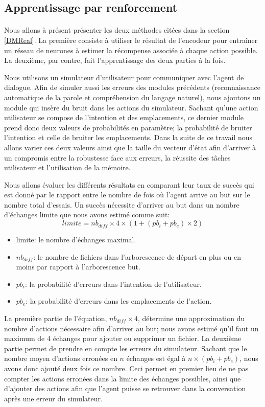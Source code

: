 \subsection{Apprentissage par renforcement}
\paragraph{}Nous allons à présent présenter les deux méthodes citées dans la section \ref{DMReal}. La première consiste à utiliser le résultat de l'encodeur pour entraîner un réseau de neurones à estimer la récompense associée à chaque action possible. La deuxième, par contre, fait l'apprentissage des deux parties à la fois.
\par Nous utilisons un simulateur d'utilisateur pour communiquer avec l'agent de dialogue. Afin de simuler aussi les erreurs des modules précédents (reconnaissance automatique de la parole et compréhension du langage naturel), nous ajoutons un module qui insère du bruit dans les actions du simulateur. Sachant qu'une action utilisateur se compose de l'intention et des emplacements, ce dernier module prend donc deux valeurs de probabilités en paramètre; la probabilité de bruiter l'intention et celle de bruiter les emplacements. Dans la suite de ce travail nous allons varier ces deux valeurs ainsi que la taille du vecteur d'état afin d'arriver à un compromis entre la robustesse face aux erreurs, la réussite des tâches utilisateur et l'utilisation de la mémoire.
\par Nous allons évaluer les différents résultats en comparant leur taux de succès qui est donné par le rapport entre le nombre de fois où l'agent arrive au but sur le nombre total d'essais. Un succès nécessite d'arriver au but dans un nombre d'échanges limite que nous avons estimé comme suit: 
\[limite = nb_{diff} \times 4 \times (1 + (pb_i + pb_e) \times 2) \]
\begin{itemize}
	\item limite: le nombre d'échanges maximal.
	\item $nb_{diff}$: le nombre de fichiers dans l'arborescence de départ en plus ou en moins par rapport à l'arborescence but.
	\item $pb_i$: la probabilité d'erreurs dans l'intention de l'utilisateur.
	\item $pb_e$: la probabilité d'erreurs dans les emplacements de l'action.
\end{itemize}
\par La première partie de l'équation, $nb_{diff} \times 4$, détermine une approximation du nombre d'actions nécessaire afin d'arriver au but; nous avons estimé qu'il faut un maximum de 4 échanges pour ajouter ou supprimer un fichier. La deuxième partie permet de prendre en compte les erreurs du simulateur. Sachant que le nombre moyen d'actions erronées en $n$ échanges est égal à $n \times (pb_i + pb_e)$, nous avons donc ajouté deux fois ce nombre. Ceci permet en premier lieu de ne pas compter les actions erronées dans la limite des échanges possibles, ainsi que d'ajouter des actions afin que l'agent puisse se retrouver dans la conversation après une erreur du simulateur.
